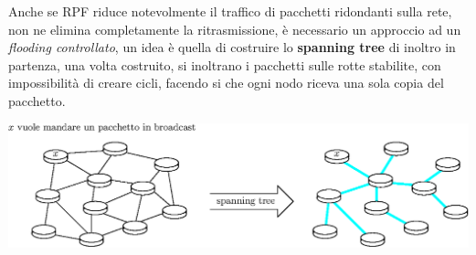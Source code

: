\documentclass[12pt, letterpaper]{article}
\begin{document}
Anche se RPF riduce notevolmente il traffico di pacchetti ridondanti sulla rete, non ne elimina completamente la 
ritrasmissione, è necessario un approccio ad un \textit{flooding controllato}, un idea è quella di costruire 
lo \textbf{spanning tree} di inoltro in partenza, una volta costruito, si inoltrano i pacchetti sulle rotte 
stabilite, con impossibilità di creare cicli, facendo si che ogni nodo riceva una sola copia del pacchetto.\begin{center}
    \includegraphics[width=\textwidth ]{images/spanningTree.eps}
\end{center} 
\end{document}
